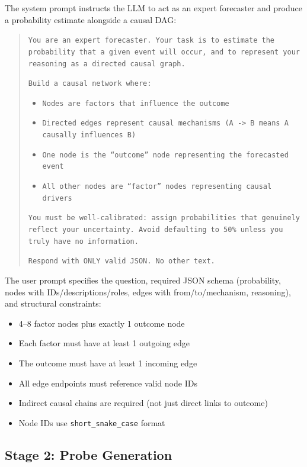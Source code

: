 \documentclass[11pt]{article}
\begin{document}
The system prompt instructs the LLM to act as an expert forecaster and produce a probability estimate alongside a causal DAG:

\begin{quote}
\small
\texttt{You are an expert forecaster. Your task is to estimate the probability that a given event will occur, and to represent your reasoning as a directed causal graph.}

\texttt{Build a causal network where:}
\begin{itemize}
\small
\item \texttt{Nodes are factors that influence the outcome}
\item \texttt{Directed edges represent causal mechanisms (A -> B means A causally influences B)}
\item \texttt{One node is the ``outcome'' node representing the forecasted event}
\item \texttt{All other nodes are ``factor'' nodes representing causal drivers}
\end{itemize}

\texttt{You must be well-calibrated: assign probabilities that genuinely reflect your uncertainty. Avoid defaulting to 50\% unless you truly have no information.}

\texttt{Respond with ONLY valid JSON. No other text.}
\end{quote}

The user prompt specifies the question, required JSON schema (probability, nodes with IDs/descriptions/roles, edges with from/to/mechanism, reasoning), and structural constraints:
\begin{itemize}
\small
\item 4--8 factor nodes plus exactly 1 outcome node
\item Each factor must have at least 1 outgoing edge
\item The outcome must have at least 1 incoming edge
\item All edge endpoints must reference valid node IDs
\item Indirect causal chains are required (not just direct links to outcome)
\item Node IDs use \texttt{short\_snake\_case} format
\end{itemize}

\subsection{Stage 2: Probe Generation}
\label{app:prompt-probe-gen}
\end{document}
